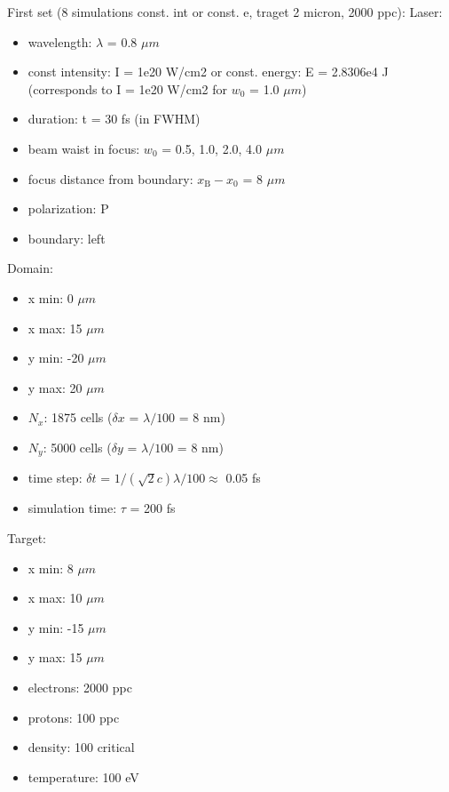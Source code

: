 \noindent
First set (8 simulations const. int or const. e, traget 2 micron, 2000 ppc):
\noindent
Laser:
\begin{itemize}
	\item wavelength: $ \lambda $ = 0.8 $ \mu m $
	\item const intensity: I = 1e20 W/cm2 or const. energy: E = 2.8306e4 J (corresponds to I = 1e20 W/cm2 for $ w_0 $ = 1.0 $ \mu m $)
	\item duration: t = 30 fs (in FWHM)
	\item beam waist in focus: $ w_0 $ = 0.5, 1.0, 2.0, 4.0 $ \mu m $
	\item focus distance from boundary: $ x_\mathrm{B} - x_0 $ = 8 $ \mu m $
	\item polarization: P
	\item boundary: left 
\end{itemize}
Domain:
\begin{itemize}
	\item x min: 0 $ \mu m $
	\item x max: 15 $ \mu m $
	\item y min: -20 $ \mu m $
	\item y max: 20 $ \mu m $
	\item $ N_x $: 1875 cells ($ \delta x $ = $ \lambda/100 $ = 8 nm)
	\item $ N_y $: 5000 cells ($ \delta y $ = $ \lambda/100 $ = 8 nm)
	\item time step: $ \delta t $ = $ 1/(\sqrt{2} c) \lambda /100 \approx $ 0.05 fs 
	\item simulation time: $ \tau $ = 200 fs
\end{itemize}
Target:
\begin{itemize}
	\item x min: 8 $ \mu m $
	\item x max: 10 $ \mu m $
	\item y min: -15 $ \mu m $
	\item y max: 15 $ \mu m $
	\item electrons: 2000 ppc
	\item protons: 100 ppc
	\item density: 100 critical
	\item temperature: 100 eV
\end{itemize}

